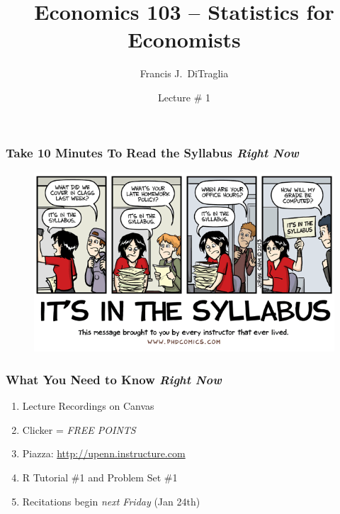 \documentclass{beamer}
\title[Econ 103]{Economics 103 -- Statistics for Economists}
\author[F. DiTraglia]{Francis J.\ DiTraglia}
\institute{University of Pennsylvania}
\date{Lecture \# 1}
\begin{document}
 





\begin{frame}[plain]
	\titlepage 
	

\end{frame} 


\begin{frame}
\frametitle{Take 10 Minutes To Read the Syllabus \emph{Right Now}}

\begin{figure}
\includegraphics[scale=0.4]{./images/syllabus.png}
\end{figure}


\end{frame}
\begin{frame}
\frametitle{What You Need to Know \emph{Right Now}}

\begin{enumerate}
	\item Lecture Recordings on Canvas
	\item Clicker = \emph{FREE POINTS}
	\item Piazza: \url{http://upenn.instructure.com} 
	\item R Tutorial \#1 and Problem Set \#1
	\item Recitations begin \emph{next Friday} (Jan 24th)
\end{enumerate}

\end{frame}
\end{document}
